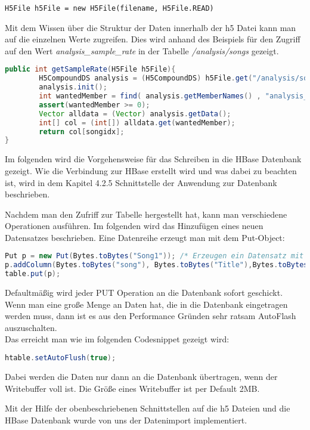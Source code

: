 \begin{lstlisting}[caption={fgdfgfd}, label=mapreduce:dgdgs]
H5File h5File = new H5File(filename, H5File.READ)
\end{lstlisting}

Mit dem Wissen über die Struktur der Daten innerhalb der h5 Datei kann man auf die einzelnen Werte zugreifen. Dies wird anhand des Beispiels für den Zugriff auf den Wert \textit{analysis\_sample\_rate} in der Tabelle \textit{/analysis/songs} gezeigt.

\begin{lstlisting}[language=Java]
public int getSampleRate(H5File h5File){
        H5CompoundDS analysis = (H5CompoundDS) h5File.get("/analysis/songs");
        analysis.init();
        int wantedMember = find( analysis.getMemberNames() , "analysis_sample_rate");
        assert(wantedMember >= 0);
        Vector alldata = (Vector) analysis.getData();
        int[] col = (int[]) alldata.get(wantedMember);
        return col[songidx];
}
\end{lstlisting}

Im folgenden wird die Vorgehensweise für das Schreiben in die HBase Datenbank gezeigt. Wie die Verbindung zur HBase erstellt wird und was dabei zu beachten ist, wird in dem Kapitel 4.2.5 Schnittstelle der Anwendung zur Datenbank beschrieben.

Nachdem man den Zufriff zur Tabelle hergestellt hat, kann man verschiedene Operationen ausführen.
Im folgenden wird das Hinzufügen eines neuen Datensatzes beschrieben.
Eine Datenreihe erzeugt man mit dem Put-Object:

\begin{lstlisting}[language=Java]
Put p = new Put(Bytes.toBytes("Song1")); /* Erzeugen ein Datensatz mit dem RowKey = "Song1'' */
p.addColumn(Bytes.toBytes("song"), Bytes.toBytes("Title"),Bytes.toBytes("HISTORY")); /* Erzeuge fuer diesen RowKey inder Spaltenfamileie "Song" die Splate "Title" mit dem Wert "HISTORY" */
table.put(p);
\end{lstlisting}

Defaultmäßig wird jeder PUT Operation an die Datenbank sofort geschickt. Wenn man eine große Menge an Daten hat, die in die Datenbank eingetragen werden muss, dann ist es aus den Performance Gründen sehr ratsam AutoFlash auszuschalten. \\
Das erreicht man wie im folgenden Codesnippet gezeigt wird:
\begin{lstlisting}[language=Java]
htable.setAutoFlush(true);
\end{lstlisting}
Dabei werden die Daten nur dann an die Datenbank übertragen, wenn der Writebuffer voll ist. Die Größe eines Writebuffer ist per Default 2MB. 

Mit der Hilfe der obenbeschriebenen Schnittstellen auf die h5 Dateien und die HBase Datenbank wurde von uns der Datenimport implementiert.

